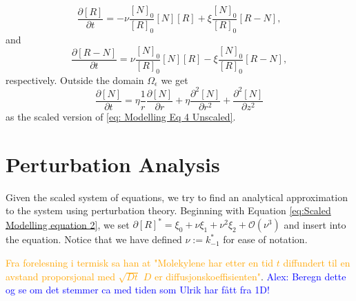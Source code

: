 \documentclass{article}
\begin{document}
\begin{equation}
    \frac{\partial [R]}{\partial t} = - \nu \frac{[N]_0}{[R]_0} [N][R] + \xi \frac{[N]_0}{[R]_0} [R-N],
    \label{skalert_sylinder3}
\end{equation}
and 
\begin{equation}
    \frac{\partial [R-N]}{\partial t} = \nu \frac{[N]_0}{[R]_0} [N][R] - \xi \frac{[N]_0}{[R]_0} [R-N],
    \label{skalert_sylinder4}
\end{equation}
respectively. Outside the domain $\Omega_\epsilon$ we get
\begin{equation}
    \frac{\partial [N]}{\partial t} = 
    \eta \frac{1}{r} \frac{\partial [N]}{\partial r} +\eta  \frac{\partial^2 [N]}{\partial r^2}  +  \frac{\partial^2 [N]}{\partial z^2}
    \label{skalert_sylinder5}
\end{equation}
as the scaled version of \eqref{eq: Modelling Eq 4 Unscaled}.

\section{Perturbation Analysis}
Given the scaled system of equations, we try to find an analytical approximation to the system using perturbation theory. Beginning with Equation \eqref{eq:Scaled Modelling equation 2}, we set $\partial [R]^* = \xi_0 + \nu \xi_1 + \nu^2 \xi_2 + \mathcal{O}(\nu^3)$ and insert into the equation. Notice that we have defined $\nu := k_{-1}^*$ for ease of notation.  

\textcolor{orange}{Fra forelesning i termisk sa han at "Molekylene har etter en tid $t$ diffundert til en avstand proporsjonal med $\sqrt{D t}$ $D$ er diffusjonskoeffisienten"}. \textcolor{blue}{Alex: Beregn dette og se om det stemmer ca med tiden som Ulrik har fått fra 1D!}
\end{document}
